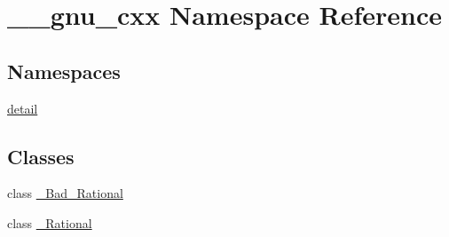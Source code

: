 \hypertarget{namespace____gnu__cxx}{}\section{\+\_\+\+\_\+gnu\+\_\+cxx Namespace Reference}
\label{namespace____gnu__cxx}
\subsection*{Namespaces}
\begin{DoxyCompactItemize}
\item 
 \hyperlink{namespace____gnu__cxx_1_1detail}{detail}
\end{DoxyCompactItemize}
\subsection*{Classes}
\begin{DoxyCompactItemize}
\item 
class \hyperlink{class____gnu__cxx_1_1__Bad__Rational}{\+\_\+\+Bad\+\_\+\+Rational}
\item 
class \hyperlink{class____gnu__cxx_1_1__Rational}{\+\_\+\+Rational}
\end{DoxyCompactItemize}
